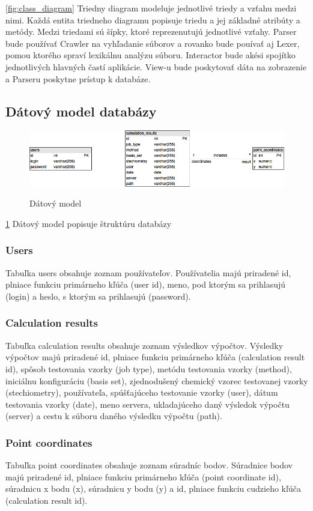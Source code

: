 \documentclass[12pt,a4paper]{article}
\begin{document}
\ref{fig:class_diagram}
Triedny diagram modeluje jednotlivé triedy a vzťahu medzi nimi. Každá entita triedneho diagramu popisuje triedu a jej základné atribúty a metódy. Medzi triedami sú šípky, ktoré reprezenutujú jednotlivé vzťahy. Parser bude používať Crawler na vyhľadanie súborov a rovanko bude pouívať aj Lexer, pomou ktorého spraví lexikálnu analýzu súboru. Interactor bude akési spojítko jednotlivých hlavných častí aplikácie. View-u bude poskytovať dáta na zobrazenie a Parseru poskytne prístup k databáze.


\subsection{Dátový model databázy}
\begin{figure}	[H]
	\caption{Dátový model}
	\includegraphics[width=\textwidth]{datovy_model}
	\label{fig:datovy_model}
\end{figure}

\ref{fig:datovy_model}
Dátový model popisuje štruktúru databázy
\subsubsection*{Users}
Tabuľka users obsahuje zoznam používateľov. Používatelia majú priradené id, plniace funkciu primárneho kľúča (user id), meno, pod ktorým sa prihlasujú (login) a heslo, s ktorým sa prihlasujú (password).
\subsubsection*{Calculation results}
Tabuľka calculation results obsahuje zoznam výsledkov výpočtov. Výsledky výpočtov majú priradené id, plniace funkciu primárneho kľúča (calculation result id), spôsob testovania vzorky (job type), metódu testovania vzorky (method), iniciálnu konfiguráciu (basis set), zjednodušený chemický vzorec testovanej vzorky (stechiometry), používateľa, spúšťajúceho testovanie vzorky (user), dátum testovania vzorky (date), meno servera, ukladajúceho daný výsledok výpočtu (server) a cestu k súboru daného výsledku výpočtu (path).
\subsubsection*{Point coordinates}
Tabuľka point coordinates obsahuje zoznam súradníc bodov. Súradnice bodov majú priradené id, plniace funkciu primárneho kľúča (point coordinate id), súradnicu x bodu (x), súradnicu y bodu (y) a id, plniace funkciu cudzieho kľúča (calculation result id).
\end{document}
